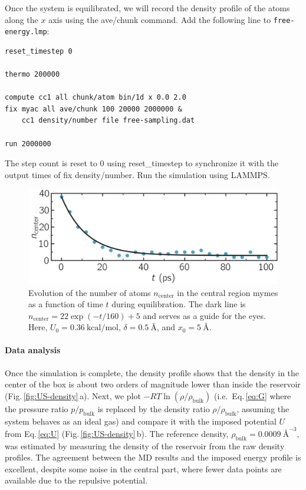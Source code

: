 \documentclass[9pt,tutorial]{livecoms}
\newcommand{\lmpcmd}[1]{\hspace{0pt}\colorbox{listing}{\textcolor{command}{\small{#1}}}\hspace{0pt}} %
\newcommand{\flecmd}[1]{\textcolor{command}{\texttt{#1}}} %
\begin{document}
Once the system is equilibrated, we will record the density profile of
the atoms along the $x$ axis using the \lmpcmd{ave/chunk} command.
Add the following line to \flecmd{free-energy.lmp}:
\begin{lstlisting}
reset_timestep 0

thermo 200000

compute cc1 all chunk/atom bin/1d x 0.0 2.0
fix myac all ave/chunk 100 20000 2000000 &
    cc1 density/number file free-sampling.dat

run 2000000
\end{lstlisting}
The step count is reset to 0 using \lmpcmd{reset\_timestep} to synchronize it
with the output times of \lmpcmd{fix density/number}.  Run the simulation using
LAMMPS.

\begin{figure}
\centering
\includegraphics[width=\linewidth]{US-density-evolution}
\caption{Evolution of the number of atoms $n_\text{center}$ in the central
region \lmpcmd{mymes} as a function of time $t$ during equilibration.  The dark line
is $n_\text{center} = 22 \exp(-t/160)+5$ and serves as a guide for the eyes.  Here, $U_0 = 0.36~\text{kcal/mol}$,
$\delta = 0.5~\text{\AA{}}$, and $x_0 = 5~\text{\AA{}}$.}
\label{fig:US-density-evolution}
\end{figure}

\paragraph{Data analysis}

Once the simulation is complete, the density profile shows that the density in the center of the box is
about two orders of magnitude lower than inside the reservoir (Fig.\,\ref{fig:US-density}\,a).
Next, we plot $-R T \ln(\rho/\rho_\mathrm{bulk})$ (i.e.~Eq.\,\eqref{eq:G} where
the pressure ratio $p/p_\mathrm{bulk}$ is replaced by the density ratio
$\rho/\rho_\mathrm{bulk}$, assuming the system behaves as an ideal gas) and compare it
with the imposed potential $U$ from Eq.\,\eqref{eq:U} (Fig.\,\ref{fig:US-density}\,b).
The reference density, $\rho_\text{bulk} = 0.0009~\text{\AA{}}^{-3}$,
was estimated by measuring the density of the reservoir from the raw density
profiles.  The agreement between the MD results and the imposed energy profile
is excellent, despite some noise in the central part, where fewer data points
are available due to the repulsive potential.
\end{document}
